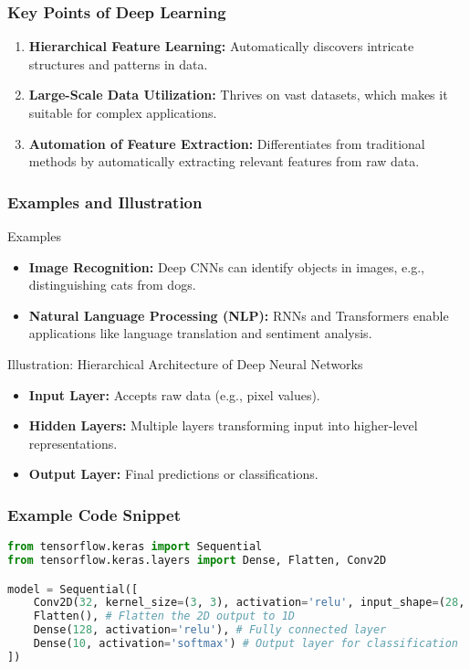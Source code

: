 \documentclass[aspectratio=169]{beamer}
\begin{document}
\begin{frame}[fragile]
    \frametitle{Key Points of Deep Learning}
    \begin{enumerate}
        \item \textbf{Hierarchical Feature Learning:} Automatically discovers intricate structures and patterns in data.
        \item \textbf{Large-Scale Data Utilization:} Thrives on vast datasets, which makes it suitable for complex applications.
        \item \textbf{Automation of Feature Extraction:} Differentiates from traditional methods by automatically extracting relevant features from raw data.
    \end{enumerate}
\end{frame}

\begin{frame}[fragile]
    \frametitle{Examples and Illustration}
    \begin{block}{Examples}
        \begin{itemize}
            \item \textbf{Image Recognition:} Deep CNNs can identify objects in images, e.g., distinguishing cats from dogs.
            \item \textbf{Natural Language Processing (NLP):} RNNs and Transformers enable applications like language translation and sentiment analysis.
        \end{itemize}
    \end{block}

    \begin{block}{Illustration: Hierarchical Architecture of Deep Neural Networks}
        \begin{itemize}
            \item \textbf{Input Layer:} Accepts raw data (e.g., pixel values).
            \item \textbf{Hidden Layers:} Multiple layers transforming input into higher-level representations.
            \item \textbf{Output Layer:} Final predictions or classifications.
        \end{itemize}
    \end{block}
\end{frame}

\begin{frame}[fragile]
    \frametitle{Example Code Snippet}
    \begin{lstlisting}[language=Python]
from tensorflow.keras import Sequential
from tensorflow.keras.layers import Dense, Flatten, Conv2D

model = Sequential([
    Conv2D(32, kernel_size=(3, 3), activation='relu', input_shape=(28, 28, 1)), # Convolutional layer
    Flatten(), # Flatten the 2D output to 1D
    Dense(128, activation='relu'), # Fully connected layer
    Dense(10, activation='softmax') # Output layer for classification
])
    \end{lstlisting}
\end{frame}
\end{document}
